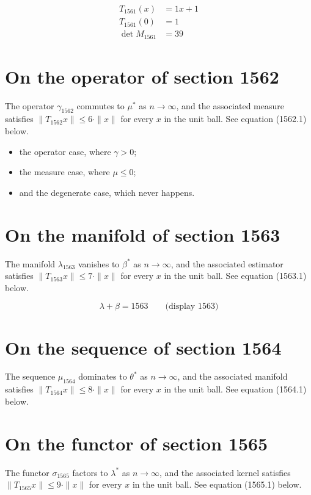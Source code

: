 \documentclass{article}
\begin{document}
\begin{align}
T_{1561}(x) &= 1 x + 1 \\
T_{1561}(0) &= 1 \\
\det M_{1561} &= 39
\end{align}

\section{On the operator of section 1562}
The operator $\gamma_{1562}$ commutes to $\mu^{*}$ as $n \to \infty$,
and the associated measure satisfies $\|T_{1562} x\| \leq 6 \cdot \|x\|$
for every $x$ in the unit ball. See equation (1562.1) below.

\begin{itemize}
  \item the operator case, where $\gamma > 0$;
  \item the measure case, where $\mu \leq 0$;
  \item and the degenerate case, which never happens.
\end{itemize}

\section{On the manifold of section 1563}
The manifold $\lambda_{1563}$ vanishes to $\beta^{*}$ as $n \to \infty$,
and the associated estimator satisfies $\|T_{1563} x\| \leq 7 \cdot \|x\|$
for every $x$ in the unit ball. See equation (1563.1) below.

$$
\lambda + \beta = 1563 \qquad \text{(display 1563)}
$$

\section{On the sequence of section 1564}
The sequence $\mu_{1564}$ dominates to $\theta^{*}$ as $n \to \infty$,
and the associated manifold satisfies $\|T_{1564} x\| \leq 8 \cdot \|x\|$
for every $x$ in the unit ball. See equation (1564.1) below.

\section{On the functor of section 1565}
The functor $\sigma_{1565}$ factors to $\lambda^{*}$ as $n \to \infty$,
and the associated kernel satisfies $\|T_{1565} x\| \leq 9 \cdot \|x\|$
for every $x$ in the unit ball. See equation (1565.1) below.
\end{document}
